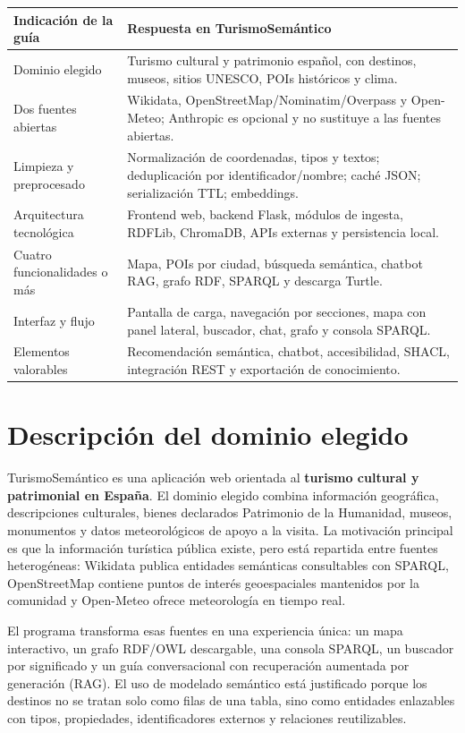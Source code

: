 \documentclass[10pt,a4paper]{article}
\newcommand{\proyecto}{TurismoSemántico}
\newcommand{\separaseccion}{\vspace{0.65\baselineskip}}
\begin{document}
\begin{table}[H]
\centering
\scriptsize
\begin{tabularx}{\textwidth}{p{3.1cm}X}
\toprule
\textbf{Indicación de la guía} & \textbf{Respuesta en \proyecto{}}\\
\midrule
Dominio elegido & Turismo cultural y patrimonio español, con destinos, museos, sitios UNESCO, POIs históricos y clima.\\
Dos fuentes abiertas & Wikidata, OpenStreetMap/Nominatim/Overpass y Open-Meteo; Anthropic es opcional y no sustituye a las fuentes abiertas.\\
Limpieza y preprocesado & Normalización de coordenadas, tipos y textos; deduplicación por identificador/nombre; caché JSON; serialización TTL; embeddings.\\
Arquitectura tecnológica & Frontend web, backend Flask, módulos de ingesta, RDFLib, ChromaDB, APIs externas y persistencia local.\\
Cuatro funcionalidades o más & Mapa, POIs por ciudad, búsqueda semántica, chatbot RAG, grafo RDF, SPARQL y descarga Turtle.\\
Interfaz y flujo & Pantalla de carga, navegación por secciones, mapa con panel lateral, buscador, chat, grafo y consola SPARQL.\\
Elementos valorables & Recomendación semántica, chatbot, accesibilidad, SHACL, integración REST y exportación de conocimiento.\\
\bottomrule
\end{tabularx}
\end{table}

\separaseccion{}
\section{Descripción del dominio elegido}

\proyecto{} es una aplicación web orientada al \textbf{turismo cultural y patrimonial en España}. El dominio elegido combina información geográfica, descripciones culturales, bienes declarados Patrimonio de la Humanidad, museos, monumentos y datos meteorológicos de apoyo a la visita. La motivación principal es que la información turística pública existe, pero está repartida entre fuentes heterogéneas: Wikidata publica entidades semánticas consultables con SPARQL, OpenStreetMap contiene puntos de interés geoespaciales mantenidos por la comunidad y Open-Meteo ofrece meteorología en tiempo real.

El programa transforma esas fuentes en una experiencia única: un mapa interactivo, un grafo RDF/OWL descargable, una consola SPARQL, un buscador por significado y un guía conversacional con recuperación aumentada por generación (RAG). El uso de modelado semántico está justificado porque los destinos no se tratan solo como filas de una tabla, sino como entidades enlazables con tipos, propiedades, identificadores externos y relaciones reutilizables.
\end{document}
